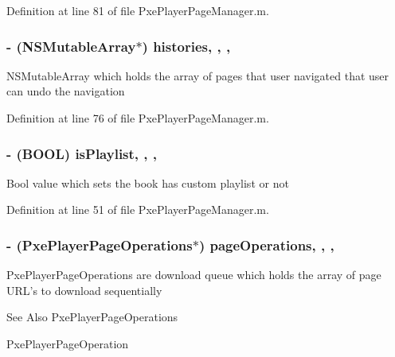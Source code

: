 Definition at line 81 of file Pxe\-Player\-Page\-Manager.\-m.

\hypertarget{category_pxe_player_page_manager_07_08_a67cd80bd4518f3d9f2a13575878543f6}{
\subsubsection[{histories}]{\setlength{\rightskip}{0pt plus 5cm}-\/ (N\-S\-Mutable\-Array$\ast$) histories\hspace{0.3cm}{\ttfamily [read]}, {\ttfamily [write]}, {\ttfamily [nonatomic]}, {\ttfamily [strong]}}}\label{category_pxe_player_page_manager_07_08_a67cd80bd4518f3d9f2a13575878543f6}
N\-S\-Mutable\-Array which holds the array of pages that user navigated that user can undo the navigation 

Definition at line 76 of file Pxe\-Player\-Page\-Manager.\-m.

\hypertarget{category_pxe_player_page_manager_07_08_a6593a02ae5353431f23a8fd7c74dd256}{
\subsubsection[{is\-Playlist}]{\setlength{\rightskip}{0pt plus 5cm}-\/ (B\-O\-O\-L) is\-Playlist\hspace{0.3cm}{\ttfamily [read]}, {\ttfamily [write]}, {\ttfamily [nonatomic]}, {\ttfamily [assign]}}}\label{category_pxe_player_page_manager_07_08_a6593a02ae5353431f23a8fd7c74dd256}
Bool value which sets the book has custom playlist or not 

Definition at line 51 of file Pxe\-Player\-Page\-Manager.\-m.

\hypertarget{category_pxe_player_page_manager_07_08_a736f70880c4e6ba6af0bb9a793096333}{
\subsubsection[{page\-Operations}]{\setlength{\rightskip}{0pt plus 5cm}-\/ (Pxe\-Player\-Page\-Operations$\ast$) page\-Operations\hspace{0.3cm}{\ttfamily [read]}, {\ttfamily [write]}, {\ttfamily [nonatomic]}, {\ttfamily [strong]}}}\label{category_pxe_player_page_manager_07_08_a736f70880c4e6ba6af0bb9a793096333}
Pxe\-Player\-Page\-Operations are download queue which holds the array of page U\-R\-L's to download sequentially \begin{DoxySeeAlso}{See Also}
Pxe\-Player\-Page\-Operations 

Pxe\-Player\-Page\-Operation 
\end{DoxySeeAlso}


